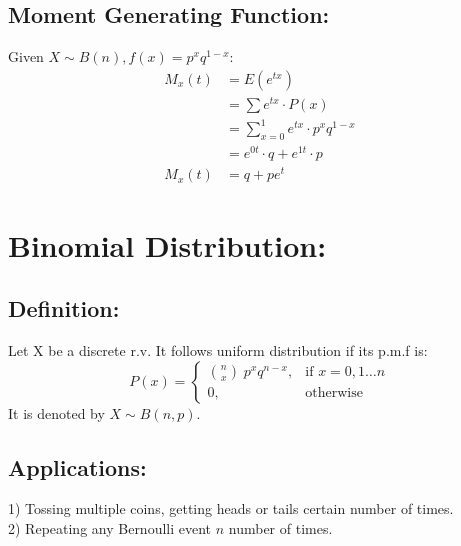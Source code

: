 \documentclass[
10pt, %
a4paper, %
]{report}
\begin{document}
\subsection*{Moment Generating Function:}
Given \(X \sim B(n), f(x)=p^x q^{1-x}:\)
\begin{align*}
    M_x(t) &= E(e^{tx}) \\
           &= \sum e^{tx} \cdot P(x) \\
           &= \sum_{x=0}^1 e^{tx} \cdot p^x q^{1-x} \\
           &= e^{0t} \cdot q + e^{1t} \cdot p\\
    M_x(t) &= q+pe^t
\end{align*}
\newpage

\section*{Binomial Distribution:}
\subsection*{Definition:}
Let X be a discrete r.v. It follows uniform distribution if its p.m.f is:
\[
    P(x)= 
\begin{cases}
    \binom{n}{x}\;p^x q^{n-x},        & \text{if } x = 0,1\dots n\\
    0,                              & \text{otherwise}
\end{cases}
\]
It is denoted by \(X \sim B(n, p).\)

\subsection*{Applications:}
1) Tossing multiple coins, getting heads or tails certain number of times. \\
2) Repeating any Bernoulli event \(n\) number of times.
\end{document}
